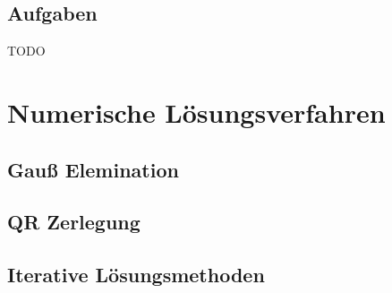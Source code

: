 \section{Aufgaben}
TODO

\chapter{Numerische Lösungsverfahren}

\section{Gauß Elemination}

\section{QR Zerlegung}

\section{Iterative Lösungsmethoden}




